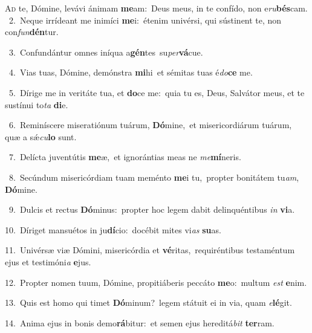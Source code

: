 \lettrine{\initial\textcolor{\initialcolor}{A}}{d} te, Dómine, levávi ánimam \textbf{me}\-am:~\star Deus meus, in te confído, non e\-\textit{ru}\-\textbf{bés}cam.\\
{\numbfont\textcolor{\numbcolor}{~2.}}~Neque irrídeant me inimíci \textbf{me}\-i:~\star étenim univérsi, qui sústinent te, non con\-\textit{fun}\-\textbf{dén}tur.\par
{\numbfont\textcolor{\numbcolor}{~3.}}~Confundántur omnes iníqua a\-\textbf{gén}\-tes~\star su\-\textit{per}\-\textbf{vá}cue.\par
{\numbfont\textcolor{\numbcolor}{~4.}}~Vias tuas, Dómine, demónstra \textbf{mi}\-hi~\star et sémitas tuas é\-\textit{do}\-\textbf{ce} me.\par
{\numbfont\textcolor{\numbcolor}{~5.}}~Dírige me in veritáte tua, et \textbf{do}\-ce me:~\star quia tu es, Deus, Salvátor meus, et te sustínui to\textit{ta} \textbf{di}\-e.\par
{\numbfont\textcolor{\numbcolor}{~6.}}~Reminíscere miseratiónum tuárum, \textbf{Dó}\-mine,~\star et misericordiárum tuárum, quæ a sǽ\-\textit{cu}\-\textbf{lo} sunt.\par
{\numbfont\textcolor{\numbcolor}{~7.}}~Delícta juventútis \textbf{me}\-æ,~\star et ignorántias meas ne \textit{me}\-\textbf{mí}neris.\par
{\numbfont\textcolor{\numbcolor}{~8.}}~Secúndum misericórdiam tuam meménto \textbf{me}\-i tu,~\star propter bonitátem tu\-\textit{am}\-, \textbf{Dó}\-mine.\par
{\numbfont\textcolor{\numbcolor}{~9.}}~Dulcis et rectus \textbf{Dó}\-minus:~\star propter hoc legem dabit delinquéntibus \textit{in} \textbf{vi}\-a.\par
{\numbfont\textcolor{\numbcolor}{10.}}~Díriget mansuétos in ju\-\textbf{dí}\-cio:~\star docébit mites vi\textit{as} \textbf{su}\-as.\par
{\numbfont\textcolor{\numbcolor}{11.}}~Univérsæ viæ Dómini, misericórdia et \textbf{vé}\-ritas,~\star requiréntibus testaméntum ejus et testimóni\textit{a} \textbf{e}\-jus.\par
{\numbfont\textcolor{\numbcolor}{12.}}~Propter nomen tuum, Dómine, propitiáberis peccáto \textbf{me}\-o:~\star multum \textit{est} \textbf{e}\-nim.\par
{\numbfont\textcolor{\numbcolor}{13.}}~Quis est homo qui timet \textbf{Dó}\-minum?~\star legem státuit ei in via, quam \textit{e}\-\textbf{lé}git.\par
{\numbfont\textcolor{\numbcolor}{14.}}~Anima ejus in bonis demo\-\textbf{rá}\-bitur:~\star et semen ejus hereditá\textit{bit} \textbf{ter}\-ram.\par
